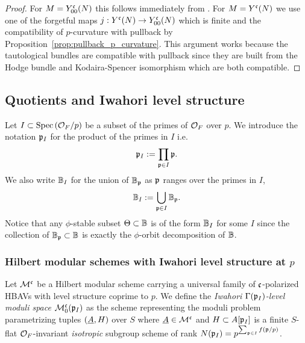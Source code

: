 \documentclass[main.tex]{subfiles}
\begin{document}
{\begin{proof}
For $M = Y^{\mathfrak{c}}_{00}(N)$ this follows immediately from \cite[Theorem~3.2.2]{goren_deshalit:foliations_shimura}. For $M = Y^{\mathfrak{c}}(N)$ we use one of the forgetful maps $j : Y^{\mathfrak{c}}(N) \to Y^{\mathfrak{c}}_{00}(N)$ which is finite \etale and the compatibility of $p$-curvature with pullback by Proposition~\ref{prop:pullback_p_curvature}. This argument works because the tautological bundles are compatible with pullback since they are built from the Hodge bundle and Kodaira-Spencer isomorphism which are both compatible.
\end{proof}

\subsection{Quotients and Iwahori level structure}

Let $I \subset \operatorname{\mathrm{Spec}}{(\mathcal{O}_F  / p)}$ be a subset of the primes of $\mathcal{O}_F$ over $p$. We introduce the notation $\mathfrak{p}_I$ for the product of the primes in $I$ i.e.\
\[ \mathfrak{p}_I := \prod_{\mathfrak{p} \in I} \mathfrak{p}. \]
We also write $\mathbb{B}_I$ for the union of $\mathbb{B}_{\mathfrak{p}}$ as $\mathfrak{p}$ ranges over the primes in $I$,
\[ \mathbb{B}_I := \bigcup_{\mathfrak{p} \in I} \mathbb{B}_{\mathfrak{p}}. \]
Notice that any $\phi$-stable subset $\Theta \subset \mathbb{B}$ is of the form $\mathbb{B}_I$ for some $I$ since the collection of $\mathbb{B}_{\mathfrak{p}} \subset \mathbb{B}$ is exactly the $\phi$-orbit decomposition of $\mathbb{B}$. 

\subsubsection{Hilbert modular schemes with Iwahori level structure at $p$}

\begin{defn}
Let $\mathcal{M}^{\mathfrak{c}}$ be a Hilbert modular scheme carrying a universal family of $\mathfrak{c}$-polarized HBAVs with level structure coprime to $p$. We define the \textit{Iwahori $\Gamma(\mathfrak{p}_I)$-level moduli space} $\mathcal{M}^{\mathfrak{c}}_0(\mathfrak{p}_I)$ as the scheme representing the moduli problem parametrizing tuples $(\underline{A}, H)$ over $S$ where $\underline{A} \in \mathcal{M}^{\mathfrak{c}}$ and $H \subset A[\mathfrak{p}_I]$ is a finite $S$-flat $\mathcal{O}_F$-invariant \textit{isotropic} subgroup scheme of rank $N(\mathfrak{p}_I) = p^{\sum_{\mathfrak{p} \in I} f(\mathfrak{p} / p)}$.  
\end{defn}

}
\end{document}
